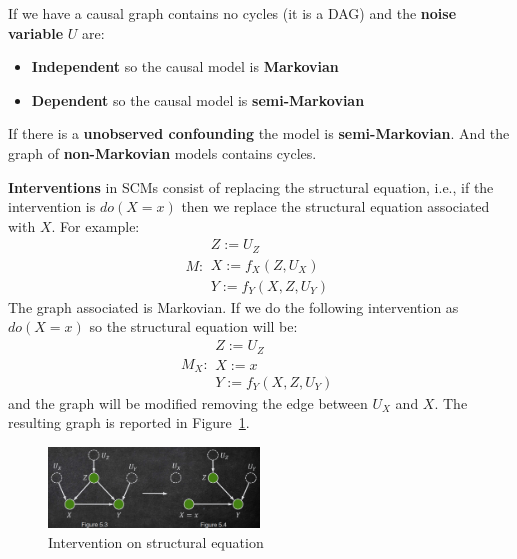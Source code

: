 If we have a causal graph contains no cycles (it is a DAG) and the \textbf{noise
    variable} $U$ are:
\begin{itemize}
    \item \textbf{Independent} so the causal model is \textbf{Markovian}
    \item \textbf{Dependent} so the causal model is \textbf{semi-Markovian}
\end{itemize}

\begin{note}
    If there is a \textbf{unobserved confounding} the model is \textbf{semi-Markovian}. And
    the graph of \textbf{non-Markovian} models contains cycles.
\end{note}

\textbf{Interventions} in SCMs consist of replacing the structural equation, i.e.,
if the intervention is $do(X = x)$ then we replace the structural equation associated
with $X$. For example:
\begin{equation}
    M : \begin{array}{l}
        Z := U_Z \\ X := f_X(Z, U_X) \\ Y:= f_Y(X, Z, U_Y)
    \end{array}
\end{equation}
The graph associated is Markovian. If we do the following intervention as $do(X = x)$
so the structural equation will be:
\begin{equation}
    M_X : \begin{array}{l}
        Z := U_Z \\ X := x \\ Y:= f_Y(X, Z, U_Y)
    \end{array}
\end{equation}
and the graph will be modified removing the edge between $U_X$ and $X$. The resulting
graph is reported in Figure~\ref{fig:intervention_graph}.
\begin{figure}[!ht]
    \centering
    \includegraphics[width=0.5\textwidth]{img/structural_causal_model/intervention_on_structural_eq.png}
    \caption{Intervention on structural equation}
    \label{fig:intervention_graph}
\end{figure}

